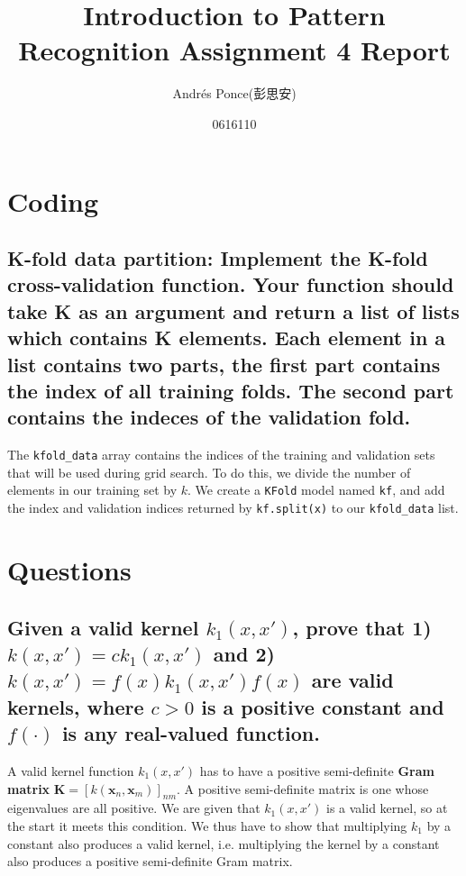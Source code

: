 \documentclass{article}
\title{Introduction to Pattern Recognition Assignment 4 Report}
\author{ Andr\'es Ponce(彭思安) \\
\and
0616110
}
\begin{document}
\maketitle
\section{Coding}
\subsection{K-fold data partition: Implement the K-fold cross-validation function.
	Your function should take K as an argument and return a list of lists which 
	contains K elements.
	Each element in a list contains two parts, the first part contains the index of all
		training folds.
	The second part contains the indeces of the validation fold.}

The \texttt{kfold\_data} array contains the indices of the training and validation sets
		that will be used during grid search. 
To do this, we divide the number of elements in our training set by $k$.
We create a \texttt{KFold} model named \texttt{kf}, and add the index and validation indices
	returned by \texttt{kf.split(x)} to our \texttt{kfold\_data} list.

\section{Questions}
	\subsection{Given a valid kernel $k_{1}(x, x')$, prove that 1)
		$k(x, x') = ck_{1}(x, x')$ and 2) $k(x, x') = f(x)k_{1}(x, x')f(x)$ are 
		valid kernels, where $c > 0$ is a positive constant and $f(\cdot)$ is any 
		real-valued function.}
	A valid kernel function $k_{1}(x, x')$ has to have a positive semi-definite \textbf{Gram matrix}
		$\mathbf{K} = [k(\mathbf{x}_{n}, \mathbf{x}_{m})]_{nm}$.
	A positive semi-definite matrix is one whose eigenvalues are all positive. 
	We are given that $k_{1}(x, x')$ is a valid kernel, so at the start it meets this condition.
	We thus have to show that multiplying $k_{1}$ by a constant also produces a valid kernel,
		i.e. multiplying the kernel by a constant also produces a positive semi-definite Gram matrix.
\end{document}
